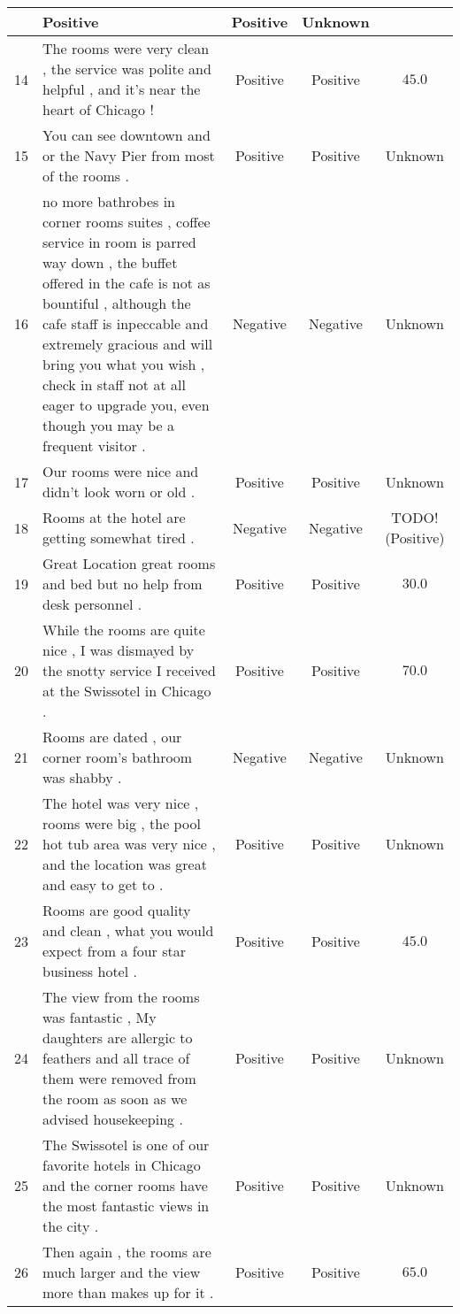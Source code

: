 \begin{landscape}
\begin{center}
\begin{longtable}{rm{9cm}ccc}
& Positive & Positive & Unknown \\ \hline
14 & The rooms were very clean , the service was polite and helpful , and it's near the heart of Chicago !
& Positive & Positive & $45.0$ \\ \hline
15 & You can see downtown and or the Navy Pier from most of the rooms .
& Positive & Positive  & Unknown \\ \hline
16 & no more bathrobes in corner rooms suites , coffee service in room is parred way down , the buffet offered in the cafe is not as bountiful , although the cafe staff is inpeccable and extremely gracious and will bring you what you wish , check in staff not at all eager to upgrade you, even though you may be a frequent visitor .
& Negative & Negative  & Unknown \\ \hline
17 & Our rooms were nice and didn't look worn or old .
& Positive & Positive  & Unknown \\ \hline
18 & Rooms at the hotel are getting somewhat tired .
& Negative & Negative & TODO! (Positive)\\ \hline
19 & Great Location great rooms and bed but no help from desk personnel .
& Positive & Positive & $30.0$ \\ \hline
20 & While the rooms are quite nice , I was dismayed by the snotty service I received at the Swissotel in Chicago .
& Positive & Positive & $70.0$ \\ \hline
21 & Rooms are dated , our corner room's bathroom was shabby .
& Negative & Negative & Unknown \\ \hline
22 & The hotel was very nice , rooms were big , the pool hot tub area was very nice , and the location was great and easy to get to .
& Positive & Positive & Unknown \\ \hline
23 &Rooms are good quality and clean , what you would expect from a four star business hotel .
& Positive & Positive & $45.0$ \\ \hline
24 &The view from the rooms was fantastic , My daughters are allergic to feathers and all trace of them were removed from the room as soon as we advised housekeeping .
& Positive & Positive & Unknown \\ \hline
25 & The Swissotel is one of our favorite hotels in Chicago and the corner rooms have the most fantastic views in the city .
& Positive & Positive & Unknown \\ \hline
26 & Then again , the rooms are much larger and the view more than makes up for it .
& Positive & Positive & $65.0$ \\ \hline

\end{longtable}
\end{center}
\end{landscape}
